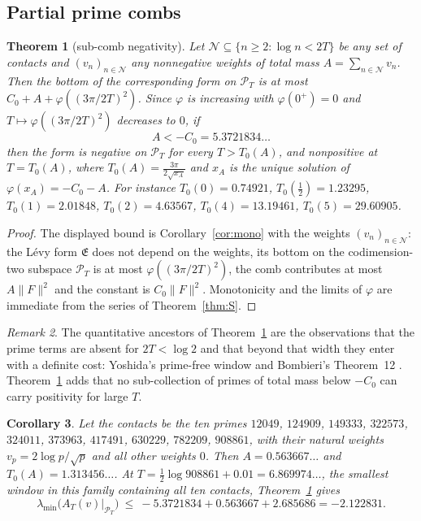 \documentclass[11pt]{amsart}
\newtheorem{theorem}{Theorem}[section]
\newtheorem{corollary}[theorem]{Corollary}
\theoremstyle{definition}
\theoremstyle{remark}
\newtheorem{remark}[theorem]{Remark}
\newcommand{\PT}{\mathcal P_T}
\newcommand{\Lev}{\mathfrak E}
\begin{document}
\subsection{Partial prime combs}
\begin{theorem}[sub-comb negativity]\label{thm:SC}
Let $\mathcal N\subseteq\{n\ge2:\log n<2T\}$ be any set of contacts and $(v_n)_{n\in\mathcal N}$ any
nonnegative weights of total mass $A=\sum_{n\in\mathcal N}v_n$. Then the bottom of the corresponding
form on $\PT$ is at most $C_0+A+\varphi((3\pi/2T)^2)$. Since $\varphi$ is increasing with
$\varphi(0^+)=0$ and $T\mapsto\varphi((3\pi/2T)^2)$ decreases to $0$, if
\[
A<-C_0=5.3721834\ldots
\]
then the form is negative on $\PT$ for every $T>T_0(A)$, and nonpositive at $T=T_0(A)$, where $T_0(A)=\frac{3\pi}{2\sqrt{x_A}}$ and
$x_A$ is the unique solution of $\varphi(x_A)=-C_0-A$. For instance $T_0(0)=0.74921$,
$T_0(\frac12)=1.23295$, $T_0(1)=2.01848$, $T_0(2)=4.63567$, $T_0(4)=13.19461$, $T_0(5)=29.60905$.
\end{theorem}
\begin{proof}
The displayed bound is Corollary~\ref{cor:mono} with the weights $(v_n)_{n\in\mathcal N}$: the L\'evy
form $\Lev$ does not depend on the weights, its bottom on the codimension-two subspace $\PT$ is at
most $\varphi((3\pi/2T)^2)$, the comb contributes at most $A\|F\|^2$ and the constant is $C_0\|F\|^2$.
Monotonicity and the limits of $\varphi$ are immediate from the series of Theorem~\ref{thm:S}.
\end{proof}
\begin{remark}
The quantitative ancestors of Theorem~\ref{thm:SC} are the observations that the prime terms are
absent for $2T<\log2$ and that beyond that width they enter with a definite cost: Yoshida's prime-free
window \cite{Yoshida1992} and Bombieri's Theorem~12 \cite{Bombieri2000}. Theorem~\ref{thm:SC} adds
that no sub-collection of primes of total mass below $-C_0$ can carry positivity for large $T$.
\end{remark}


\begin{corollary}\label{cor:SC1}
Let the contacts be the ten primes $12049$, $124909$, $149333$, $322573$, $324011$, $373963$,
$417491$, $630229$, $782209$, $908861$, with their natural weights $v_p=2\log p/\sqrt p$ and all other
weights $0$. Then $A=0.563667\ldots$ and $T_0(A)=1.313456\ldots$. At
$T=\frac12\log908861+0.01=6.869974\ldots$, the smallest window in this family containing all ten
contacts, Theorem~\ref{thm:SC} gives
\[
\lambda_{\min}\big(A_T(v)\big|_{\PT}\big)\ \le\ -5.3721834+0.563667+2.685686=-2.122831 .
\]
\end{corollary}
\end{document}
